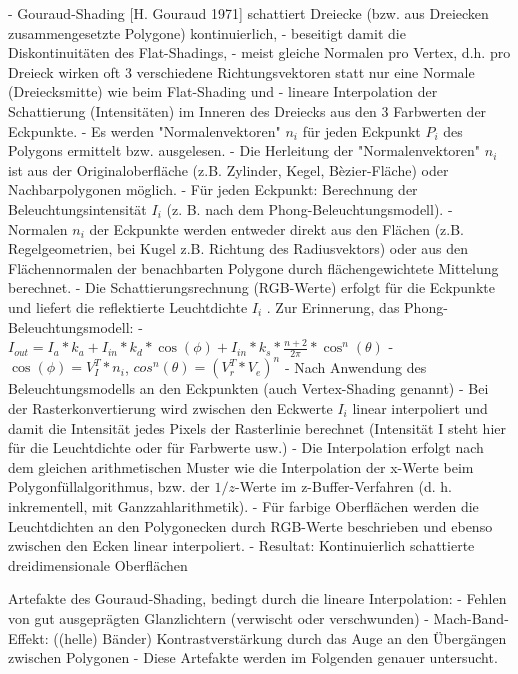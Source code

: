\documentclass[10pt,landscape]{article}
\begin{document}
\begin{multicols}{3}
- Gouraud-Shading [H. Gouraud 1971] schattiert Dreiecke (bzw. aus Dreiecken zusammengesetzte Polygone) kontinuierlich,
- beseitigt damit die Diskontinuitäten des Flat-Shadings,
- meist gleiche Normalen pro Vertex, d.h. pro Dreieck wirken oft 3 verschiedene Richtungsvektoren statt nur eine Normale (Dreiecksmitte) wie beim Flat-Shading und
- lineare Interpolation der Schattierung (Intensitäten) im Inneren des Dreiecks aus den 3 Farbwerten der Eckpunkte.
- Es werden "Normalenvektoren" $n_i$ für jeden Eckpunkt $P_i$ des Polygons ermittelt bzw. ausgelesen.
- Die Herleitung der "Normalenvektoren" $n_i$ ist aus der Originaloberfläche (z.B. Zylinder, Kegel, Bèzier-Fläche) oder Nachbarpolygonen möglich.
- Für jeden Eckpunkt: Berechnung der Beleuchtungsintensität $I_i$ (z. B. nach dem Phong-Beleuchtungsmodell).
- Normalen $n_i$ der Eckpunkte werden entweder direkt aus den Flächen (z.B. Regelgeometrien, bei Kugel z.B. Richtung des Radiusvektors) oder aus den Flächennormalen der benachbarten Polygone durch flächengewichtete Mittelung berechnet.
- Die Schattierungsrechnung (RGB-Werte) erfolgt für die Eckpunkte und liefert die reflektierte Leuchtdichte $I_i$ . Zur Erinnerung, das Phong-Beleuchtungsmodell:
  - $I_{out}=I_a*k_a+I_{in}*k_d*\cos(\phi)+I_{in}*k_s*\frac{n+2}{2\pi}*\cos^n(\theta)$
  - $\cos(\phi)=V^T_I*n_i$, $cos^n(\theta)=(V^T_r * V_e)^n$
- Nach Anwendung des Beleuchtungsmodells an den Eckpunkten (auch Vertex-Shading genannt)
- Bei der Rasterkonvertierung wird zwischen den Eckwerte $I_i$ linear interpoliert und damit die Intensität jedes Pixels der Rasterlinie berechnet (Intensität I steht hier für die Leuchtdichte oder für Farbwerte usw.)
- Die Interpolation erfolgt nach dem gleichen arithmetischen Muster wie die Interpolation der x-Werte beim Polygonfüllalgorithmus, bzw. der $1/z$-Werte im z-Buffer-Verfahren (d. h. inkrementell, mit Ganzzahlarithmetik).
- Für farbige Oberflächen werden die Leuchtdichten an den Polygonecken durch RGB-Werte beschrieben und ebenso zwischen den Ecken linear interpoliert.
- Resultat: Kontinuierlich schattierte dreidimensionale Oberflächen


Artefakte des Gouraud-Shading, bedingt durch die lineare Interpolation:
- Fehlen von gut ausgeprägten Glanzlichtern (verwischt oder verschwunden)
- Mach-Band-Effekt: ((helle) Bänder) Kontrastverstärkung durch das Auge an den Übergängen zwischen Polygonen
- Diese Artefakte werden im Folgenden genauer untersucht.


\end{multicols}
\end{document}

